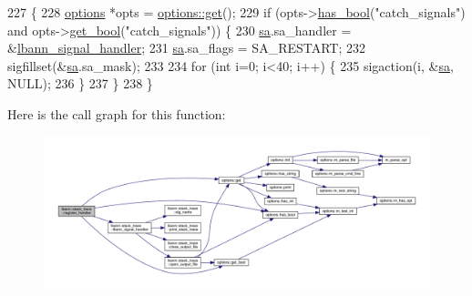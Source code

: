 \begin{DoxyCode}
227                         \{
228   \hyperlink{classoptions}{options} *opts = \hyperlink{classoptions_a9ecfe9c365269df68a41b961c31ae3f5}{options::get}();
229   \textcolor{keywordflow}{if} (opts->\hyperlink{classoptions_aafb1d2a7ccde0b1bf786230ba4080ecd}{has\_bool}(\textcolor{stringliteral}{"catch\_signals"}) and opts->\hyperlink{classoptions_a99aa190102de33e2aed39723929f9fad}{get\_bool}(\textcolor{stringliteral}{"catch\_signals"})) \{
230     \hyperlink{namespacelbann_1_1stack__trace_a4a87ea956ec9344d4432f5e7d3dd445e}{sa}.sa\_handler = &\hyperlink{namespacelbann_1_1stack__trace_a4bf58556b9c42ac8930c273a921172de}{lbann\_signal\_handler};
231     \hyperlink{namespacelbann_1_1stack__trace_a4a87ea956ec9344d4432f5e7d3dd445e}{sa}.sa\_flags = SA\_RESTART;
232     sigfillset(&\hyperlink{namespacelbann_1_1stack__trace_a4a87ea956ec9344d4432f5e7d3dd445e}{sa}.sa\_mask);
233 
234     \textcolor{keywordflow}{for} (\textcolor{keywordtype}{int} i=0; i<40; i++) \{
235       sigaction(i, &\hyperlink{namespacelbann_1_1stack__trace_a4a87ea956ec9344d4432f5e7d3dd445e}{sa}, NULL);
236     \}
237   \}
238 \}
\end{DoxyCode}
Here is the call graph for this function\+:\nopagebreak
\begin{figure}[H]
\begin{center}
\leavevmode
\includegraphics[width=350pt]{namespacelbann_1_1stack__trace_a12c3aa60ec15015b925249fc61352f07_cgraph}
\end{center}
\end{figure}
\mbox{\label{namespacelbann_1_1stack__trace_a1063a9a501d78a7525224461e155a483}} 
